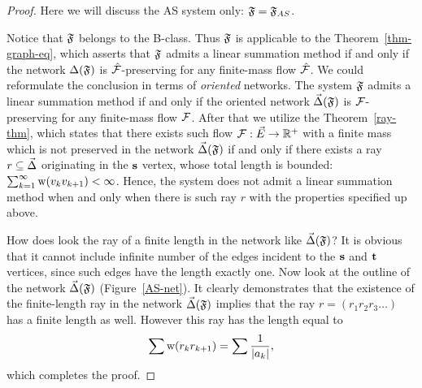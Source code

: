 \documentclass[12pt]{amsart}
\begin{document}
      \begin{proof}
        Here we will discuss the AS system only: $\mathfrak{F} = \mathfrak{F}_{AS}$.

        Notice that $\mathfrak{F}$ belongs to the B-class.
        Thus $\mathfrak{F}$ is applicable to the Theorem~\ref{thm-graph-eq}, which asserts
          that $\mathfrak{F}$ admits a linear summation method if and only if
          the network $\Delta(\mathfrak{F})$ is $\mathcal{\hat{F}}$-preserving for any
          finite-mass flow $\mathcal{\hat{F}}$.
        We could reformulate the conclusion in terms of \emph{oriented} networks.
        The system $\mathfrak{F}$ admits a linear summation method if and only if
          the oriented network $\vec{\Delta}(\mathfrak{F})$ is $\mathcal{F}$-preserving for any
          finite-mass flow $\mathcal{F}$.
        After that we utilize the Theorem~\ref{ray-thm}, which states that there exists such
          flow $\mathcal{F}: \vec{E} \to \mathbb{R}^{+}$ with a finite mass which is not preserved in
          the network $\vec{\Delta}(\mathfrak{F})$
          if and only if there exists a ray $r \subseteq \vec{\Delta} $ originating in the $\mathbf{s}$ vertex,
          whose total length is bounded: $ \sum_{k=1}^\infty \mathrm{w}(v_k v_{k+1}) < \infty$.
          Hence, the system does not admit a linear summation method when and only when there is such ray $r$
            with the properties specified up above.

          How does look the ray of a finite length in the network like $\vec{\Delta}(\mathfrak{F})$?
          It is obvious that it cannot include infinite number of the edges incident to the
            $\mathbf{s}$ and $\mathbf{t}$ vertices, since such edges have the length exactly one.
          Now look at the outline of the network $\vec{\Delta}(\mathfrak{F})$ (Figure~\ref{AS-net}).
          It clearly demonstrates that the existence of the finite-length ray in the network $\vec{\Delta}(\mathfrak{F})$ implies that
            the ray $r=(r_1 r_2 r_3\dots)$ has a finite length as well.
          However this ray has the length equal to
          \[
            \sum \mathrm{w}(r_k r_{k+1}) = \sum \frac{1}{|a_k|},
          \]
          which completes the proof.
      \end{proof}
      \pagebreak
\end{document}
